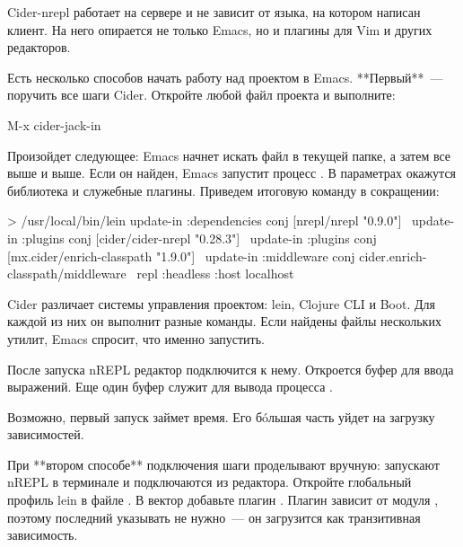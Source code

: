 Cider-nrepl работает на сервере и не зависит от языка, на котором написан клиент. На него опирается не только Emacs, но и плагины для Vim и других редакторов.

Есть несколько способов начать работу над проектом в Emacs. **Первый**~--- поручить все шаги Cider. Откройте любой файл проекта и выполните:

\begin{english}
  \begin{text}
M-x cider-jack-in
  \end{text}
\end{english}

Произойдет следующее: Emacs начнет искать файл  в текущей папке, а затем все выше и выше. Если он найден, Emacs запустит процесс . В параметрах окажутся библиотека  и служебные плагины. Приведем итоговую команду в сокращении:

\begin{english}
  \begin{bash}
> /usr/local/bin/lein
  update-in :dependencies conj [nrepl/nrepl "0.9.0"] \
  update-in :plugins conj [cider/cider-nrepl "0.28.3"] \
  update-in :plugins conj [mx.cider/enrich-classpath "1.9.0"] \
  update-in :middleware conj cider.enrich-classpath/middleware \
  repl :headless :host localhost
  \end{bash}
\end{english}

Cider различает системы управления проектом: lein, Clojure CLI и Boot. Для каждой из них он выполнит разные команды. Если найдены файлы нескольких утилит, Emacs спросит, что именно запустить.

После запуска nREPL редактор подключится к нему. Откроется буфер  для ввода выражений. Еще один буфер  служит для вывода процесса .

Возможно, первый запуск \code{cider-jack-in} займет время. Его бóльшая часть уйдет на загрузку зависимостей.

При **втором способе** подключения шаги проделывают вручную: запускают nREPL в терминале и подключаются из редактора. Откройте глобальный профиль lein в файле \code{~/.lein/profiles.clj}. В вектор  \arr {} добавьте плагин . Плагин зависит от модуля , поэтому последний указывать не нужно~--- он загрузится как транзитивная зависимость.

